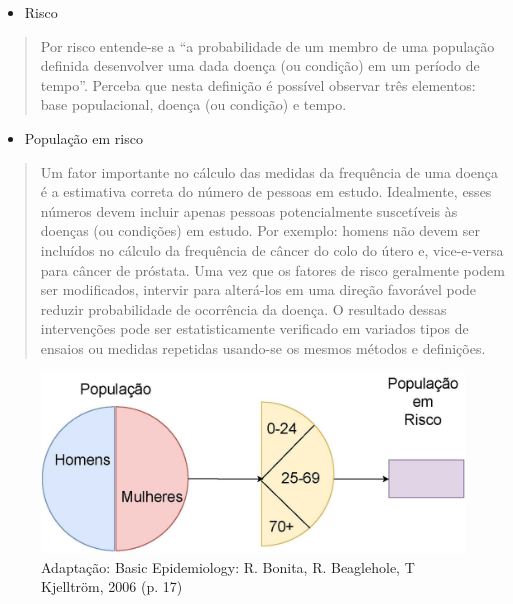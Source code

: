 \documentclass[
]{book}
\providecommand{\tightlist}{%
  \setlength{\itemsep}{0pt}\setlength{\parskip}{0pt}}
\begin{document}
\hfill\break

\begin{itemize}
\tightlist
\item
  Risco
\end{itemize}

\hfill\break

\begin{quote}
Por risco entende-se a ``a probabilidade de um membro de uma população definida desenvolver uma dada doença (ou condição) em um período de tempo''. Perceba que nesta definição é possível observar três elementos: base populacional, doença (ou condição) e tempo.
\end{quote}

\hfill\break

\begin{itemize}
\tightlist
\item
  População em risco
\end{itemize}

\hfill\break

\begin{quote}
Um fator importante no cálculo das medidas da frequência de uma doença é a estimativa correta do número de pessoas em estudo. Idealmente, esses números devem incluir apenas pessoas potencialmente suscetíveis às doenças (ou condições) em estudo. Por exemplo: homens não devem ser incluídos no cálculo da frequência de câncer do colo do útero e, vice-e-versa para câncer de próstata. Uma vez que os fatores de risco geralmente podem ser modificados, intervir para alterá-los em uma direção favorável pode reduzir probabilidade de ocorrência da doença. O resultado dessas intervenções pode ser estatisticamente verificado em variados tipos de ensaios ou medidas repetidas usando-se os mesmos métodos e definições.
\end{quote}

\hfill\break

\begin{figure}

{\centering \includegraphics[width=0.6\linewidth]{images8/ilustracao_epidemiologia1} 

}

\caption{Adaptação: Basic Epidemiology: R. Bonita, R. Beaglehole, T Kjelltröm, 2006 (p. 17)}\label{fig:fig43}
\end{figure}
\end{document}
